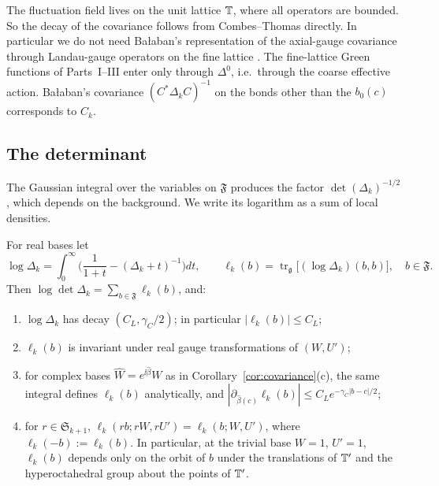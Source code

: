 The fluctuation field lives on the unit lattice $\mathbb T$, where all operators are bounded. So the decay of the covariance follows from Combes--Thomas directly. In particular we do not need Ba\l aban's representation of the axial-gauge covariance through Landau-gauge operators on the fine lattice \cite[(3.183)--(3.185)]{BalBackground}. The fine-lattice Green functions of Parts~I--III enter only through $\Delta^0$, i.e.\ through the coarse effective action. Ba\l aban's covariance $(C^*\Delta_kC)^{-1}$ on the bonds other than the $b_0(c)$ \cite[(2.5)--(2.7)]{BalYM4II} corresponds to $C_k$.

\subsection{The determinant}\label{ss:34.4}

The Gaussian integral over the variables on $\mathfrak F$ produces the factor $\det(\Delta_k)^{-1/2}$, which depends on the background. We write its logarithm as a sum of local densities.

\begin{proposition}\label{prop:det-densities}
For real bases let
\[
\log\Delta_k=\int_0^\infty\Big(\frac1{1+t}-(\Delta_k+t)^{-1}\Big)dt,\qquad\ell_k(b)=\operatorname{tr}_{\mathfrak g}\big[(\log\Delta_k)(b,b)\big],\quad b\in\mathfrak F .
\]
Then $\log\det\Delta_k=\sum_{b\in\mathfrak F}\ell_k(b)$, and:
\begin{enumerate}[label=(\alph*)]
\item $\log\Delta_k$ has decay $(C_L,\gamma_C/2)$; in particular $|\ell_k(b)|\le C_L$;
\item $\ell_k(b)$ is invariant under real gauge transformations of $(W,U')$;
\item for complex bases $\hat W=e^{\ii\hat\beta}W$ as in Corollary~\ref{cor:covariance}(c), the same integral defines $\ell_k(b)$ analytically, and $|\partial_{\hat\beta(c)}\ell_k(b)|\le C_Le^{-\gamma_C|b-c|/2}$;
\item for $r\in\mathfrak S_{k+1}$, $\ell_k(rb;rW,rU')=\ell_k(b;W,U')$, where $\ell_k(-b):=\ell_k(b)$. In particular, at the trivial base $W=1$, $U'=1$, $\ell_k(b)$ depends only on the orbit of $b$ under the translations of $\mathbb T'$ and the hyperoctahedral group about the points of $\mathbb T'$.
\end{enumerate}
\end{proposition}

